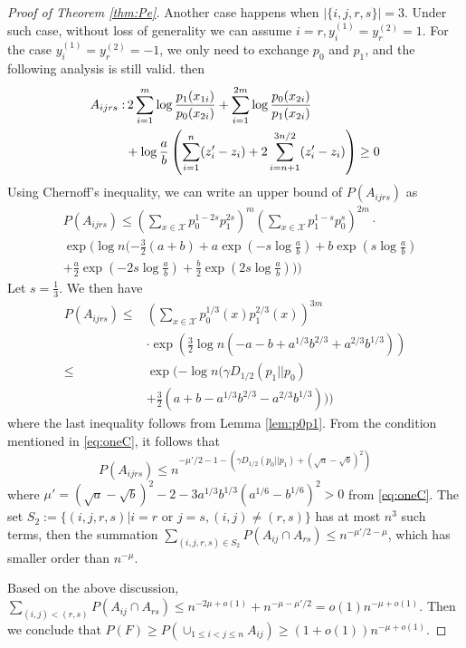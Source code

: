 \documentclass[conference,letterpaper]{IEEEtran}
\begin{document}
\begin{proof}[Proof of Theorem \ref{thm:Pe}]
Another case happens when $|\{i,j,r,s\}|=3$. Under such case, without loss of generality we can assume $i=r, y^{(1)}_i = y^{(2)}_r = 1$.
For the case $y^{(1)}_i = y^{(2)}_r = -1$, we only need to exchange
$p_0$ and $p_1$, and the following analysis is still valid.
then
\begin{align}
A_{ijrs}: &\, 2\sum_{i=1}^m  \log \frac{p_1(x_{1i})}{p_0(x_{2i})}
+ \sum_{i=1}^{2m} \log \frac{p_0(x_{2i})}{p_1(x_{2i})} \\
& +\log\frac{a}{b}\left(
\sum_{i=1}^{n} (z'_i - z_i) + 2\sum_{i=n+1}^{3n/2} (z'_i - z_i)\right)  \geq 0\notag
\end{align}
Using Chernoff's inequality, we can write an upper bound of $P(A_{ijrs})$ as
\begin{align*}
&P(A_{ijrs}) \leq
(\sum_{x\in \mathcal{X}} p_0^{1-2s}p_1^{2s})^m
(\sum_{x\in \mathcal{X}} p_1^{1-s}p_0^{s})^{2m} \cdot \\
&\exp(\log n (-\frac{3}{2}(a+b)+a\exp(-s\log \frac{a}{b})+b\exp(s\log \frac{a}{b}) \\
&+ \frac{a}{2}\exp(-2s\log \frac{a}{b})+\frac{b}{2}\exp(2s\log \frac{a}{b})))
\end{align*}
Let $s=\frac{1}{3}$. We then have
\begin{align*}
P(A_{ijrs})\leq & (\sum_{x\in \mathcal{X}} p_0^{1/3}(x)p_1^{2/3}(x))^{3m}\\
& \cdot \exp(\frac{3}{2}\log n (-a-b+a^{1/3}b^{2/3}+a^{2/3}b^{1/3})) \\
\leq &  \exp(-\log n(\gamma D_{1/2}(p_1 || p_0) \\
&+ \frac{3}{2} (a+b-a^{1/3}b^{2/3}-a^{2/3}b^{1/3})))
\end{align*}
where the last inequality follows from Lemma \ref{lem:p0p1}.
From the condition mentioned in \eqref{eq:oneC},
it follows that
$$
P(A_{ijrs}) \leq n^{-\mu'/2-1-(\gamma  D_{1/2}(p_0||p_1) + (\sqrt{a} - \sqrt{b})^2)}
$$
where $\mu'=(\sqrt{a}-\sqrt{b})^2-2 
- 3a^{1/3}b^{1/3}(a^{1/6}-b^{1/6})^2>0$ from \eqref{eq:oneC}. 
The set $S_2:=\{(i,j,r,s)| i=r \textrm{ or } j=s, (i,j)\neq (r,s) \}$
has at most $n^3$ such terms,
then the summation $\sum_{(i,j,r,s)\in S_2}
P(A_{ij}\cap A_{rs}) \leq n^{-\mu'/2-\mu }$,
which has smaller order than $n^{-\mu}$.

Based on the above discussion, 
$\sum_{(i,j) < (r,s) } P(A_{ij} \cap A_{rs})\leq n^{-2\mu + o(1)}
+ n^{-\mu - \mu'/2} = o(1) n^{-\mu + o(1)}$.
Then we conclude that $P(F) \geq P(\cup_{1\leq i < j\leq n} A_{ij}) \geq
(1+o(1))n^{-\mu + o(1)}$.
\end{proof}
\end{document}
